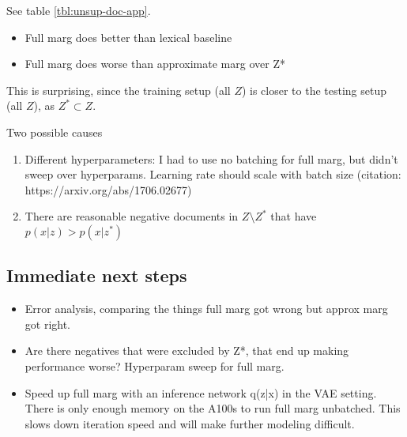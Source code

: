\documentclass[11pt]{article}
\begin{document}
See table \ref{tbl:unsup-doc-app}.

\begin{itemize}
\item Full marg does better than lexical baseline
\item Full marg does worse than approximate marg over Z*
\end{itemize}
This is surprising, since the training setup (all $Z$) is closer to the testing setup (all $Z$),
as $Z^*\subset Z$.

Two possible causes
\begin{enumerate}
\item Different hyperparameters: I had to use no batching for full marg, but didn’t sweep over hyperparams. Learning rate should scale with batch size (citation: https://arxiv.org/abs/1706.02677)
\item There are reasonable negative documents in $Z \setminus Z^*$ that have $p(x|z) > p(x|z^*)$
\end{enumerate}

\subsection{Immediate next steps}
\begin{itemize}
\item Error analysis, comparing the things full marg got wrong but approx marg got right.
\item Are there negatives that were excluded by Z*, that end up making performance worse?
Hyperparam sweep for full marg.
\item Speed up full marg with an inference network q(z|x) in the VAE setting.
There is only enough memory on the A100s to run full marg unbatched. This slows down iteration speed and will make further modeling difficult.
\end{itemize}
\end{document}
